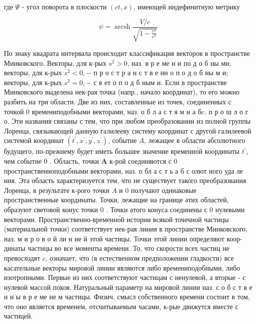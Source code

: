 \documentclass[10pt]{article}
\begin{document}
где $\Psi$ - угол поворота в плоскости $(c t, x)$, имеющей индефинитную метрику



\[

\psi=\operatorname{arcsh} \frac{V / c}{\sqrt{1-\frac{v^{2}}{c^{2}}}}

\]



По знаку квадрата интервала происходит классификация векторов в пространстве Минковского. Векторы, для к-рых $s^{2}>0$, наз. в р е ме н и по д о б ны ми; векторы, для к-рых $s^{2}<0,-$ п р о с т р а н с т в е нн о п о д о б ны м и; векторы, для к-рых $s^{2}=0,-$ с в ет о п о д б ным и. Если в пространстве Минковского выделена нек-рая точка (напр., начало координат), то его можно разбить на три области. Две из них, составленные из точек, соединенных с точкой 0 времениподобными векторами, наз. о б л а с т я м и а бc. п р о ш л о г о. Эти названия связаны с тем, что при любом преобразовании из полной группы Лоренца, связывающей данную галилееву систему координат с другой галилеевой системой координат $\left(t^{\prime}, x^{\prime}, y^{\prime}, z^{\prime}\right)$, событие $A$, лежащее в области абсолютного будущего, по-прежнему будет иметь большее значение временно́й координаты $t^{\prime}$, чем событие 0 . Область, точки $\boldsymbol{A}$ к-рой соединяются с 0 пространственноподобными векторами, наз. о бл а с т ь а б с олют ного уда ле ния. Эта область характеризуется тем, что не существует такого преобразования Лоренца, в результате к-рого точки $A$ и 0 получают одинаковые пространственные координаты. Точки, лежащие на границе әтих областей, образуют световой конус точки 0 . Точки әтого конуса соединены с 0 нулевыми векторами. Пространственно-временно́й истории всякой точечной частицы (материальной точки) соответствует нек-рая линия в пространстве Минковского, наз. м и р о в о й ли н ие й этой частицы. Точки этой линии определяют коор- динаты частицы во все моменты времени. То, что скорости всех частиц не превосходят $c$, означает, что (в естественном предположении гладкости) все касательные векторы мировой линии являются либо времениподобными, либо изотропными. Первые из них соответствуют частицам с ненулевой, а вторые - с нулевой массой покоя. Натуральный параметр на мировой линии наз. с о б с т в е н н ы в р е ме не м частицы. Физич. смысл собственного времени состоит в том, что оно является временем, отсчитываемым часами, к-рые движутся вместе с частицей.
\end{document}
